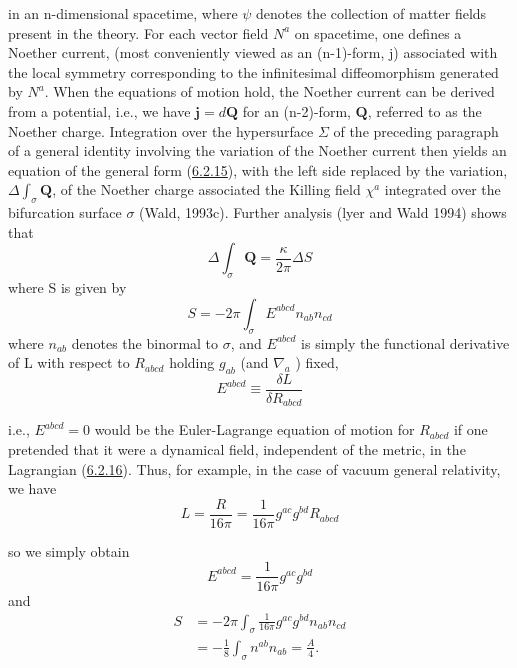 \documentclass[11pt,a4paper]{article}
\begin{document}
in an n-dimensional spacetime, where \(\psi\) denotes the collection of matter fields present in the theory. For each vector field \(N^a\) on spacetime, one defines a Noether current, (most conveniently viewed as an (n-1)-form, j) associated with the local symmetry corresponding\hypertarget{source-159}{} to the infinitesimal diffeomorphism generated by \(N^a\). When the equations of motion hold, the Noether current can be derived from a potential, i.e., we have \(\mathbf{j} = d\mathbf{Q}\) for an (n-2)-form, \(\mathbf{Q}\), referred to as the Noether charge. Integration over the hypersurface \(\Sigma\) of the preceding paragraph of a general identity involving the variation of the Noether current then yields an equation of the general form (\hyperref[eq:6.2.15]{6.2.15}), with the left side replaced by the variation, \(\Delta\int_\sigma\mathbf{Q}\), of the Noether charge associated the Killing field \(\chi^a\) integrated over the bifurcation surface \(\sigma\) (Wald, 1993c). Further analysis (lyer and Wald 1994) shows that
\begin{equation*}
\Delta \int_{\sigma} \mathbf{Q} = \frac{\kappa}{2\pi} \Delta S \tag{6.2.17}\label{eq:6.2.17}
\end{equation*}
where S is given by
\begin{equation*}
S = -2\pi \int_{\sigma} E^{abcd} n_{ab} n_{cd} \tag{6.2.18}\label{eq:6.2.18}
\end{equation*}
where \(n_{ab}\) denotes the binormal to \(\sigma\), and \(E^{abcd}\) is simply the functional derivative of L with respect to \(R_{abcd}\) holding \(g_{ab}\) (and \(\nabla_a\) ) fixed,
\begin{equation*}
E^{abcd}\equiv\frac{\delta L}{\delta R_{abcd}} \tag{6.2.19}\label{eq:6.2.19}
\end{equation*}

i.e., \(E^{abcd}=0\) would be the Euler-Lagrange equation of motion for \(R_{abcd}\) if one pretended that it were a dynamical field, independent of the metric, in the Lagrangian (\hyperref[eq:6.2.16]{6.2.16}). Thus, for example, in the case of vacuum general relativity, we have
\begin{equation*}
L=\frac{R}{16\pi}=\frac{1}{16\pi} g^{ac}g^{bd}R_{abcd} \tag{6.2.20}\label{eq:6.2.20}
\end{equation*}

so we simply obtain
\begin{equation*}
E^{abcd}=\frac{1}{16\pi} g^{ac}g^{bd} \tag{6.2.21}\label{eq:6.2.21}
\end{equation*}
and
\begin{equation*}
\begin{aligned}
S&=-2\pi\int_\sigma\frac{1}{16\pi} g^{ac}g^{bd}n_{ab}n_{cd}\\
 &=-\frac18\int_\sigma n^{ab}n_{ab}=\frac A4.
\end{aligned} \tag{6.2.22}\label{eq:6.2.22}
\end{equation*}
\end{document}
